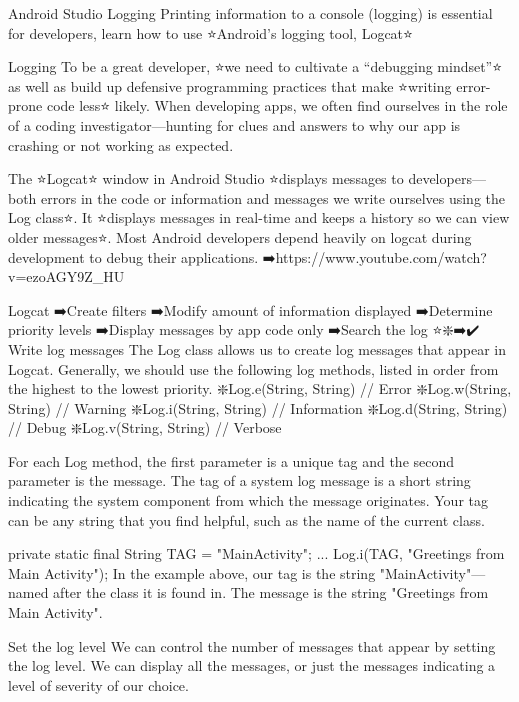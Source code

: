 Android Studio Logging
        Printing information to a console (logging) is essential for developers, learn how to use ⭐Android's logging tool, Logcat⭐

    Logging
        To be a great developer, ⭐we need to cultivate a “debugging mindset”⭐ as well as build up defensive programming practices that make ⭐writing error-prone code less⭐ likely. When developing apps, we often find ourselves in the role of a coding investigator—hunting for clues and answers to why our app is crashing or not working as expected.

        The ⭐Logcat⭐ window in Android Studio ⭐displays messages to developers—both errors in the code or information and messages we write ourselves using the Log class⭐. It ⭐displays messages in real-time and keeps a history so we can view older messages⭐. Most Android developers depend heavily on logcat during development to debug their applications.
            ➡️https://www.youtube.com/watch?v=ezoAGY9Z_HU

    Logcat
        ➡️Create filters
        ➡️Modify amount of information displayed
        ➡️Determine priority levels
        ➡️Display messages by app code only
        ➡️Search the log
⭐❇️➡️✔️
    Write log messages
        The Log class allows us to create log messages that appear in Logcat. Generally, we should use the following log methods, listed in order from the highest to the lowest priority.
            ❇️Log.e(String, String) // Error
            ❇️Log.w(String, String) // Warning
            ❇️Log.i(String, String) // Information
            ❇️Log.d(String, String) // Debug
            ❇️Log.v(String, String) // Verbose
        
        For each Log method, the first parameter is a unique tag and the second parameter is the message. The tag of a system log message is a short string indicating the system component from which the message originates. Your tag can be any string that you find helpful, such as the name of the current class.

            private static final String TAG = "MainActivity";
            ...
            Log.i(TAG, "Greetings from Main Activity");
        In the example above, our tag is the string "MainActivity"—named after the class it is found in. The message is the string "Greetings from Main Activity".

    Set the log level
        We can control the number of messages that appear by setting the log level. We can display all the messages, or just the messages indicating a level of severity of our choice.

